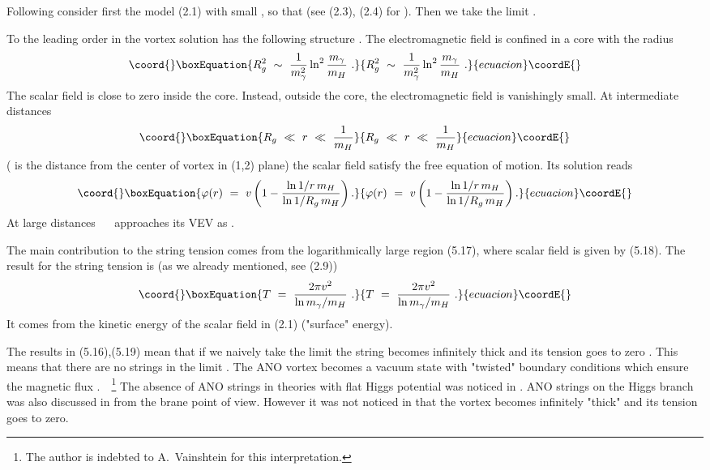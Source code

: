 \documentclass[a4paper,12pt]{article}
\begin{document}
Following \cite{Y} consider first the model (2.1) with small
\myHighlight{$\lambda$}\coordHE{}, so that \coordHE{} (see (2.3), (2.4) for
\coordHE{}). Then  we take the limit \coordHE{}.

To the leading order in \coordHE{} the vortex
solution has the following structure \cite{Y}. The
electromagnetic field is confined in a core with the radius
\begin{equation}\coord{}\boxEquation{
R^2_g\ \sim\ \frac1{m^2_\gamma}\ln^2\frac{m_\gamma}{m_H}\ .
}{
R^2_g\ \sim\ \frac1{m^2_\gamma}\ln^2\frac{m_\gamma}{m_H}\ .
}{ecuacion}\coordE{}\end{equation}
The scalar field is close to zero inside the core. Instead,
outside the core, the electromagnetic field is vanishingly
small. At intermediate distances
\begin{equation}\coord{}\boxEquation{
R_g\ \ll\ r\ \ll\ \frac1{m_H}
}{
R_g\ \ll\ r\ \ll\ \frac1{m_H}
}{ecuacion}\coordE{}\end{equation}
(\coordHE{} is the distance from the center of vortex in (1,2) plane)
the scalar field satisfy the free equation of motion. Its
solution reads \cite{Y}
\begin{equation}\coord{}\boxEquation{
\varphi(r)\ =\ v\left(1-\frac{\ln1/r\,m_H}{\ln
1/R_g\,m_H}\right) .
}{
\varphi(r)\ =\ v\left(1-\frac{\ln1/r\,m_H}{\ln
1/R_g\,m_H}\right) .
}{ecuacion}\coordE{}\end{equation}
At large distances \coordHE{}~~ \myHighlight{$\varphi$}\coordHE{} approaches its
VEV as \coordHE{}.

The main contribution to the string tension comes from the
logarithmically large region (5.17), where scalar field is given
by (5.18). The result for the string tension is \cite{Y} (as we
already mentioned, see (2.9))
\begin{equation}\coord{}\boxEquation{
T\ =\ \frac{2\pi v^2}{\ln m_\gamma/m_H}\ .
}{
T\ =\ \frac{2\pi v^2}{\ln m_\gamma/m_H}\ .
}{ecuacion}\coordE{}\end{equation}
It comes from the kinetic energy of the scalar field in (2.1)
("surface" energy).

The results in (5.16),(5.19) mean that if we naively take the
limit \coordHE{} the string becomes infinitely thick and its
tension goes to zero \cite{Y}. This means that there are no
strings in the limit \coordHE{}. The ANO vortex becomes a vacuum
state with "twisted" boundary conditions which ensure the
magnetic flux \coordHE{}.~~\footnote{The author is indebted to
A.~Vainshtein for this interpretation.} The absence of ANO
strings in theories with flat Higgs potential was noticed in
\cite{R,ARH}. ANO strings on the Higgs branch was also discussed
in \cite{GMV} from the brane point of view. However it was not
noticed in \cite{GMV} that the vortex becomes infinitely "thick"
and its tension goes to zero.
\end{document}
